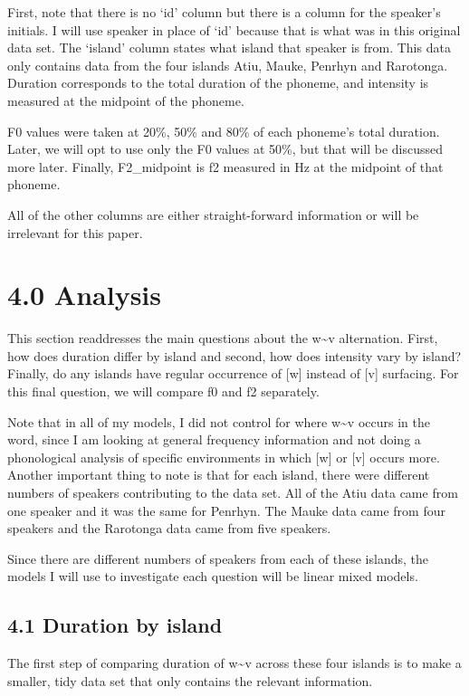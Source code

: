 \documentclass[
  ,man,floatsintext]{apa6}
\begin{document}
First, note that there is no `id' column but there is a column for the speaker's initials. I will use speaker in place of `id' because that is what was in this original data set. The `island' column states what island that speaker is from. This data only contains data from the four islands Atiu, Mauke, Penrhyn and Rarotonga. Duration corresponds to the total duration of the phoneme, and intensity is measured at the midpoint of the phoneme.

F0 values were taken at 20\%, 50\% and 80\% of each phoneme's total duration. Later, we will opt to use only the F0 values at 50\%, but that will be discussed more later. Finally, F2\_midpoint is f2 measured in Hz at the midpoint of that phoneme.

All of the other columns are either straight-forward information or will be irrelevant for this paper.

\section{4.0 Analysis}\label{analysis}

This section readdresses the main questions about the w\textasciitilde v alternation. First, how does duration differ by island and second, how does intensity vary by island? Finally, do any islands have regular occurrence of {[}w{]} instead of {[}v{]} surfacing. For this final question, we will compare f0 and f2 separately.

Note that in all of my models, I did not control for where w\textasciitilde v occurs in the word, since I am looking at general frequency information and not doing a phonological analysis of specific environments in which {[}w{]} or {[}v{]} occurs more. Another important thing to note is that for each island, there were different numbers of speakers contributing to the data set. All of the Atiu data came from one speaker and it was the same for Penrhyn. The Mauke data came from four speakers and the Rarotonga data came from five speakers.

Since there are different numbers of speakers from each of these islands, the models I will use to investigate each question will be linear mixed models.

\subsection{4.1 Duration by island}\label{duration-by-island}

The first step of comparing duration of w\textasciitilde v across these four islands is to make a smaller, tidy data set that only contains the relevant information.
\end{document}
